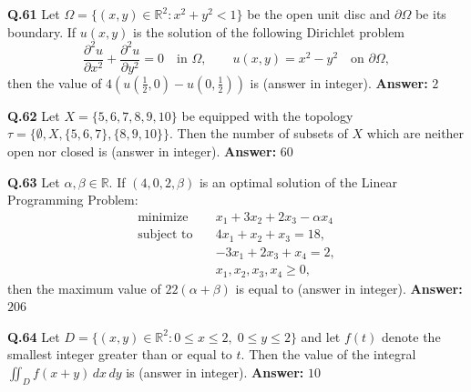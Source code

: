 \documentclass[11pt,a4paper]{article}
\newcommand{\ans}[1]{\textbf{Answer:} #1\par\medskip}
\begin{document}
\textbf{Q.61} Let $\Omega = \{(x, y) \in \mathbb{R}^2 : x^2 + y^2 < 1\}$ be the open unit disc and $\partial\Omega$ be its boundary. If $u(x, y)$ is the solution of the following Dirichlet problem
\[
  \frac{\partial^2 u}{\partial x^2} + \frac{\partial^2 u}{\partial y^2} = 0 \quad \text{in } \Omega, \qquad u(x, y) = x^2 - y^2 \quad \text{on } \partial\Omega,
\]
then the value of $4\!\left(u\!\left(\frac{1}{2}, 0\right) - u\!\left(0, \frac{1}{2}\right)\right)$ is \underline{\hspace{2cm}} (answer in integer).
\ans{$2$}

\textbf{Q.62} Let $X = \{5, 6, 7, 8, 9, 10\}$ be equipped with the topology $\tau = \{\emptyset, X, \{5, 6, 7\}, \{8, 9, 10\}\}$. Then the number of subsets of $X$ which are neither open nor closed is \underline{\hspace{2cm}} (answer in integer).
\ans{$60$}

\textbf{Q.63} Let $\alpha, \beta \in \mathbb{R}$. If $(4, 0, 2, \beta)$ is an optimal solution of the Linear Programming Problem:
\begin{align*}
  \text{minimize} \quad & x_1 + 3x_2 + 2x_3 - \alpha x_4 \\
  \text{subject to} \quad & 4x_1 + x_2 + x_3 = 18, \\
  & -3x_1 + 2x_3 + x_4 = 2, \\
  & x_1, x_2, x_3, x_4 \ge 0,
\end{align*}
then the maximum value of $22(\alpha + \beta)$ is equal to \underline{\hspace{2cm}} (answer in integer).
\ans{$206$}

\textbf{Q.64} Let $D = \{(x, y) \in \mathbb{R}^2 : 0 \le x \le 2, \; 0 \le y \le 2\}$ and let $f(t)$ denote the smallest integer greater than or equal to $t$. Then the value of the integral $\iint_D f(x + y)\,dx\,dy$ is \underline{\hspace{2cm}} (answer in integer).
\ans{$10$}
\end{document}
